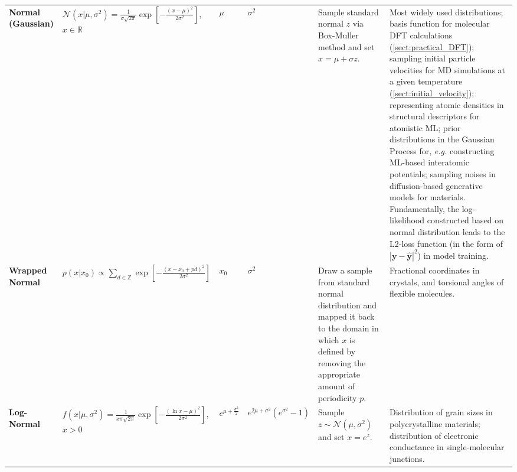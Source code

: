 \begin{longtable}{p{2cm}
    >{\raggedright\arraybackslash}p{3.5cm}
    >{\raggedright\arraybackslash}p{1.0cm}
    >{\raggedright\arraybackslash}p{2cm}
    >{\raggedright\arraybackslash}p{2.5cm}
    p{6cm}}
\footnotesize{\textbf{Normal (Gaussian)}} 
& \footnotesize{$\mathcal{N}(x|\mu,\sigma^2)=\frac{1}{\sigma\sqrt{2\pi}}\exp\left[-\frac{(x-\mu)^2}{2\sigma^2} \right]$, $x\in\mathbb{R}$}
& \footnotesize{$\mu$}
& \footnotesize{$\sigma^2$}
& \footnotesize{Sample standard normal $z$ via Box-Muller method and set $x=\mu+\sigma z$.}
& \footnotesize{Most widely used distributions; basis function for molecular DFT calculations (\cref{sect:practical_DFT}); sampling initial particle velocities for MD simulations at a given temperature (\cref{sect:initial_velocity}); representing atomic densities in structural descriptors for atomistic ML;\cite{bartok2013representing} prior distributions in the Gaussian Process for, \emph{e.g.} constructing ML-based interatomic potentials;\cite{bartok2010gaussian} sampling noises in diffusion-based generative models for materials.\cite{zeni2025generative} Fundamentally, the log-likelihood constructed based on normal distribution leads to the L2-loss function (in the form of $|\bm{y}-\hat{\bm{y}}|^2$) in model training. }\\

\footnotesize{\textbf{Wrapped Normal}} 
& \footnotesize{$p(x|x_0)\propto\sum_{d\in\mathbb{Z}}\exp\left[-\frac{(x-x_0+p d)^2}{2\sigma^2}\right]$}
& \footnotesize{$x_0$}
& \footnotesize{$\sigma^2$}
& \footnotesize{Draw a sample from standard normal distribution and mapped it back to the domain in which $x$ is defined by removing the appropriate amount of  periodicity $p$.}
&\footnotesize{Fractional coordinates in crystals,\cite{zhu2024wycryst} and torsional angles of flexible molecules.\cite{jing2022torsional}}\\

\footnotesize{\textbf{Log-Normal}} 
& \footnotesize{$f(x|\mu,\sigma^2)=\frac{1}{x\sigma\sqrt{2\pi}} \exp\left[ -\frac{(\ln x-\mu)^2}{2\sigma^2}\right]$, $x>0$}
& \footnotesize{$e^{\mu+\frac{\sigma^2}{2}}$}
& \footnotesize{$e^{2\mu+\sigma^2}(e^{\sigma^2}-1)$}
& \footnotesize{Sample $z\sim\mathcal{N}(\mu,\sigma^2)$ and set $x=e^z$.}
& \footnotesize{Distribution of grain sizes in polycrystalline materials;\cite{abraham2023crystal} distribution of electronic conductance in single-molecular junctions.\cite{mejia2023microscopic}}\\


\end{longtable}

